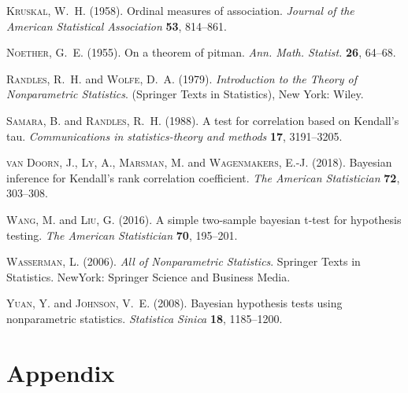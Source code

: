 \documentclass[11pt]{article}
\begin{document}
\begin{thebibliography}{18}
\textsc{Kruskal, W.~H.} (1958).
\newblock Ordinal measures of association.
\newblock \textit{Journal of the American Statistical Association} \textbf{53},
  814--861.

\textsc{Noether, G.~E.} (1955).
\newblock On a theorem of pitman.
\newblock \textit{Ann. Math. Statist.} \textbf{26}, 64--68.

\textsc{Randles, R.~H.} and \textsc{Wolfe, D.~A.} (1979).
\newblock \textit{Introduction to the {T}heory of {N}onparametric
  {S}tatistics}.
\newblock (Springer Texts in Statistics), New York: Wiley.

\textsc{Samara, B.} and \textsc{Randles, R.~H.} (1988).
\newblock A test for correlation based on {K}endall's tau.
\newblock \textit{Communications in statistics-theory and methods} \textbf{17},
  3191--3205.

\textsc{van Doorn, J.}, \textsc{Ly, A.}, \textsc{Marsman, M.} and
  \textsc{Wagenmakers, E.-J.} (2018).
\newblock Bayesian inference for {K}endall's rank correlation coefficient.
\newblock \textit{The American Statistician} \textbf{72}, 303--308.

\textsc{Wang, M.} and \textsc{Liu, G.} (2016).
\newblock A simple two-sample bayesian t-test for hypothesis testing.
\newblock \textit{The American Statistician} \textbf{70}, 195--201.

\textsc{Wasserman, L.} (2006).
\newblock \textit{All of {N}onparametric {S}tatistics}.
\newblock Springer Texts in Statistics.
\newblock NewYork: Springer Science and Business Media.

\textsc{Yuan, Y.} and \textsc{Johnson, V.~E.} (2008).
\newblock Bayesian hypothesis tests using nonparametric statistics.
\newblock \textit{Statistica Sinica} \textbf{18}, 1185--1200.

\end{thebibliography}


\section*{Appendix} \label{section:App}

\end{document}
